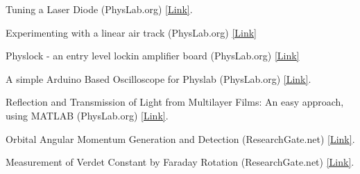 
\begin{tabitemize}
    \item Tuning a Laser Diode (PhysLab.org)  \href{https://www.physlab.org/wp-content/uploads/2016/04/TUNING_LASER_DIODE-min.pdf}{[Link]}.
    \item Experimenting with a linear air track (PhysLab.org) \href{https://www.physlab.org/wp-content/uploads/2019/05/linear-air-track-v2.pdf}{[Link]}
    \item Physlock - an entry level lockin amplifier board (PhysLab.org) \href{https://www.physlab.org/wp-content/uploads/2019/04/Physlock_report_2019.pdf}{[Link]}
    \item A simple Arduino Based Oscilloscope for Physlab (PhysLab.org) \href{https://www.physlab.org/wp-content/uploads/2019/02/Arduino_Oscilloscope__PhysLab_.pdf}{[Link]}.
    \item Reflection and Transmission of Light from Multilayer Films: An easy approach, using MATLAB (PhysLab.org) \href{https://www.physlab.org/wp-content/uploads/2016/04/MultilayerFilms.pdf}{[Link]}.
    \item Orbital Angular Momentum Generation and Detection (ResearchGate.net) 
    \href{https://www.doi.org/10.13140/RG.2.2.21594.03525/1}{[Link]}.
    \item Measurement of Verdet Constant by Faraday Rotation (ResearchGate.net)
    \href{https://www.doi.org/10.13140/RG.2.2.34028.4160}{[Link]}.
\end{tabitemize}